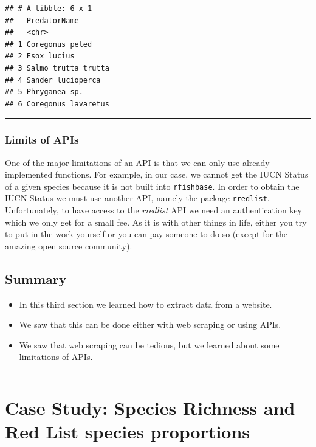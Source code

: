 \documentclass[
]{book}
\providecommand{\tightlist}{%
  \setlength{\itemsep}{0pt}\setlength{\parskip}{0pt}}
\begin{document}
\begin{verbatim}
## # A tibble: 6 x 1
##   PredatorName       
##   <chr>              
## 1 Coregonus peled    
## 2 Esox lucius        
## 3 Salmo trutta trutta
## 4 Sander lucioperca  
## 5 Phryganea sp.      
## 6 Coregonus lavaretus
\end{verbatim}

\begin{center}\rule{0.5\linewidth}{0.5pt}\end{center}

\hypertarget{limits-of-apis}{%
\subsubsection*{Limits of APIs}\label{limits-of-apis}}

One of the major limitations of an API is that we can only use already implemented functions. For example, in our case, we cannot get the IUCN Status of a given species because it is not built into \texttt{rfishbase}. In order to obtain the IUCN Status we must use another API, namely the package \texttt{rredlist}. Unfortunately, to have access to the \emph{rredlist} API we need an authentication key which we only get for a small fee. As it is with other things in life, either you try to put in the work yourself or you can pay someone to do so (except for the amazing open source community).

\hypertarget{summary}{%
\subsection{Summary}\label{summary}}

\begin{itemize}
\tightlist
\item
  In this third section we learned how to extract data from a website.
\item
  We saw that this can be done either with web scraping or using APIs.
\item
  We saw that web scraping can be tedious, but we learned about some limitations of APIs.
\end{itemize}

\begin{center}\rule{0.5\linewidth}{0.5pt}\end{center}

\hypertarget{case-study-species-richness-and-red-list-species-proportions}{%
\section{Case Study: Species Richness and Red List species proportions}\label{case-study-species-richness-and-red-list-species-proportions}}
\end{document}
